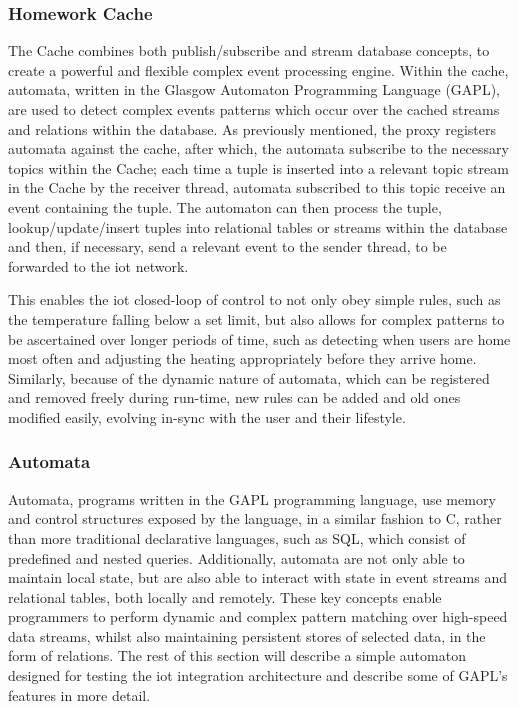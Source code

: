 \documentclass{mpaper}
\begin{document}
\subsubsection*{Homework Cache} %
\label{ssub:homework_cache}
The Cache combines both publish/subscribe and stream database concepts, to create a powerful and flexible complex event processing engine. Within the cache, automata, written in the Glasgow Automaton Programming Language (GAPL), are used to detect complex events patterns which occur over the cached streams and relations within the database. 
As previously mentioned, the proxy registers automata against the cache, after which, the automata subscribe to the necessary topics within the Cache; each time a tuple is inserted into a relevant topic stream in the Cache by the receiver thread, automata subscribed to this topic receive an event containing the tuple. The automaton can then process the tuple, lookup/update/insert tuples into relational tables or streams within the database and then, if necessary, send a relevant event to the sender thread, to be forwarded to the iot network.

This enables the iot closed-loop of control to not only obey simple rules, such as the temperature falling below a set limit, but also allows for complex patterns to be ascertained over longer periods of time, such as detecting when users are home most often and adjusting the heating appropriately before they arrive home. Similarly, because of the dynamic nature of automata, which can be registered and removed freely during run-time, new rules can be added and old ones modified easily, evolving in-sync with the user and their lifestyle.

\subsubsection*{Automata} %
\label{ssub:automata}
Automata, programs written in the GAPL programming language, use memory and control structures exposed by the language, in a similar fashion to C, rather than more traditional declarative languages, such as SQL, which consist of predefined and nested queries. Additionally, automata are not only able to maintain local state, but are also able to interact with state in event streams and relational tables, both locally and remotely. These key concepts enable programmers to perform dynamic and complex pattern matching over high-speed data streams, whilst also maintaining persistent stores of selected data, in the form of relations. The rest of this section will describe a simple automaton designed for testing the iot integration architecture and describe some of GAPL's features in more detail.
\end{document}
